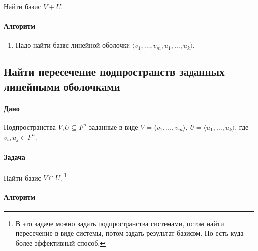 \documentclass{article}
\begin{document}
Найти базис $V + U$.

\paragraph{Алгоритм}

\begin{enumerate}
\item Надо найти базис линейной оболочки $\langle v_1,\ldots,v_m,u_1,\ldots,u_k\rangle$.
\end{enumerate}

\subsection{Найти пересечение подпространств заданных линейными оболочками}

\paragraph{Дано}

Подпространства $V,U\subseteq F^{n}$ заданные в виде $V = \langle v_1,\ldots,v_m\rangle$, $U = \langle u_1,\ldots,u_k\rangle$, где $v_i,u_j\in F^{n}$.

\paragraph{Задача}

Найти базис $V\cap U$.%
\footnote{В это задаче можно задать подпространства системами, потом найти пересечение в виде системы, потом задать результат базисом.
Но есть куда более эффективный способ.}

\paragraph{Алгоритм}
\end{document}
